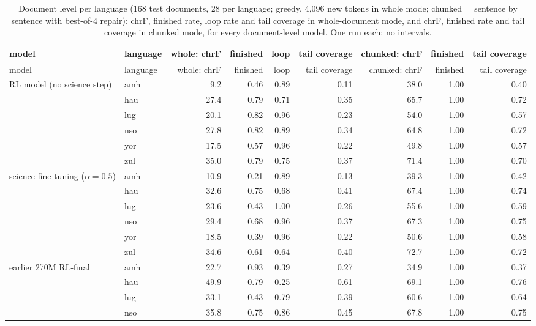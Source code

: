 {\scriptsize\setlength{\tabcolsep}{1.5pt}
\begin{longtable}{@{}llrrrrrrr@{}}
\caption{Document level per language (168 test documents, 28 per language; greedy, 4,096 new tokens in whole mode; chunked = sentence by sentence with best-of-4 repair): chrF, finished rate, loop rate and tail coverage in whole-document mode, and chrF, finished rate and tail coverage in chunked mode, for every document-level model. One run each; no intervals.}\label{tab:doc-per-language-full}\\
\toprule
model & language & whole: chrF & finished & loop & tail coverage & chunked: chrF & finished & tail coverage \\
\midrule\endfirsthead
\toprule
model & language & whole: chrF & finished & loop & tail coverage & chunked: chrF & finished & tail coverage \\
\midrule\endhead
\midrule\endfoot
\bottomrule\endlastfoot
RL model (no science step) & amh & 9.2 & 0.46 & 0.89 & 0.11 & 38.0 & 1.00 & 0.40 \\
 & hau & 27.4 & 0.79 & 0.71 & 0.35 & 65.7 & 1.00 & 0.72 \\
 & lug & 20.1 & 0.82 & 0.96 & 0.23 & 54.0 & 1.00 & 0.57 \\
 & nso & 27.8 & 0.82 & 0.89 & 0.34 & 64.8 & 1.00 & 0.72 \\
 & yor & 17.5 & 0.57 & 0.96 & 0.22 & 49.8 & 1.00 & 0.57 \\
 & zul & 35.0 & 0.79 & 0.75 & 0.37 & 71.4 & 1.00 & 0.70 \\
\midrule
science fine-tuning ($\alpha=0.5$) & amh & 10.9 & 0.21 & 0.89 & 0.13 & 39.3 & 1.00 & 0.42 \\
 & hau & 32.6 & 0.75 & 0.68 & 0.41 & 67.4 & 1.00 & 0.74 \\
 & lug & 23.6 & 0.43 & 1.00 & 0.26 & 55.6 & 1.00 & 0.59 \\
 & nso & 29.4 & 0.68 & 0.96 & 0.37 & 67.3 & 1.00 & 0.75 \\
 & yor & 18.5 & 0.39 & 0.96 & 0.22 & 50.6 & 1.00 & 0.58 \\
 & zul & 34.6 & 0.61 & 0.64 & 0.40 & 72.7 & 1.00 & 0.72 \\
\midrule
earlier 270M RL-final & amh & 22.7 & 0.93 & 0.39 & 0.27 & 34.9 & 1.00 & 0.37 \\
 & hau & 49.9 & 0.79 & 0.25 & 0.61 & 69.1 & 1.00 & 0.76 \\
 & lug & 33.1 & 0.43 & 0.79 & 0.39 & 60.6 & 1.00 & 0.64 \\
 & nso & 35.8 & 0.75 & 0.86 & 0.45 & 67.8 & 1.00 & 0.75 \\

\end{longtable}}
